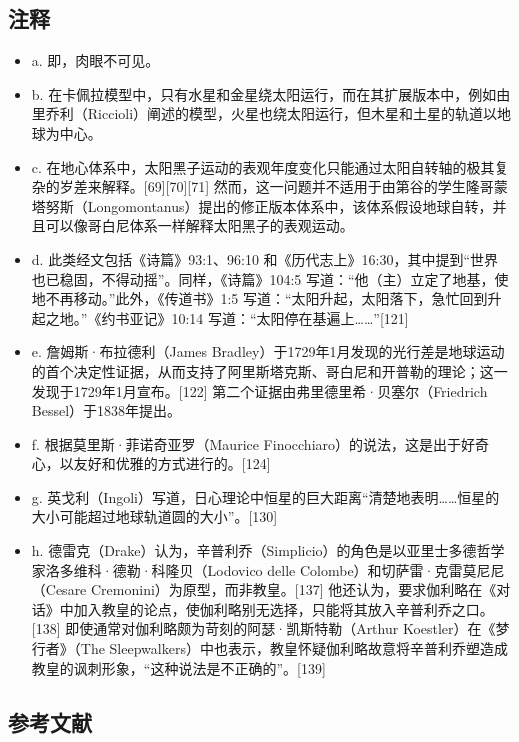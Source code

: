 \subsection{注释}  

\begin{itemize}
\item a. 即，肉眼不可见。  
\item b. 在卡佩拉模型中，只有水星和金星绕太阳运行，而在其扩展版本中，例如由里乔利（Riccioli）阐述的模型，火星也绕太阳运行，但木星和土星的轨道以地球为中心。  
\item c. 在地心体系中，太阳黑子运动的表观年度变化只能通过太阳自转轴的极其复杂的岁差来解释。[69][70][71] 然而，这一问题并不适用于由第谷的学生隆哥蒙塔努斯（Longomontanus）提出的修正版本体系中，该体系假设地球自转，并且可以像哥白尼体系一样解释太阳黑子的表观运动。  
\item d. 此类经文包括《诗篇》93:1、96:10 和《历代志上》16:30，其中提到“世界也已稳固，不得动摇”。同样，《诗篇》104:5 写道：“他（主）立定了地基，使地不再移动。”此外，《传道书》1:5 写道：“太阳升起，太阳落下，急忙回到升起之地。”《约书亚记》10:14 写道：“太阳停在基遍上……”[121]  
\item e. 詹姆斯·布拉德利（James Bradley）于1729年1月发现的光行差是地球运动的首个决定性证据，从而支持了阿里斯塔克斯、哥白尼和开普勒的理论；这一发现于1729年1月宣布。[122] 第二个证据由弗里德里希·贝塞尔（Friedrich Bessel）于1838年提出。  
\item f. 根据莫里斯·菲诺奇亚罗（Maurice Finocchiaro）的说法，这是出于好奇心，以友好和优雅的方式进行的。[124]  
\item g. 英戈利（Ingoli）写道，日心理论中恒星的巨大距离“清楚地表明……恒星的大小可能超过地球轨道圆的大小”。[130]  
\item h. 德雷克（Drake）认为，辛普利乔（Simplicio）的角色是以亚里士多德哲学家洛多维科·德勒·科隆贝（Lodovico delle Colombe）和切萨雷·克雷莫尼尼（Cesare Cremonini）为原型，而非教皇。[137] 他还认为，要求伽利略在《对话》中加入教皇的论点，使伽利略别无选择，只能将其放入辛普利乔之口。[138] 即使通常对伽利略颇为苛刻的阿瑟·凯斯特勒（Arthur Koestler）在《梦行者》（The Sleepwalkers）中也表示，教皇怀疑伽利略故意将辛普利乔塑造成教皇的讽刺形象，“这种说法是不正确的”。[139]
\end{itemize}  

\subsection{参考文献} 
